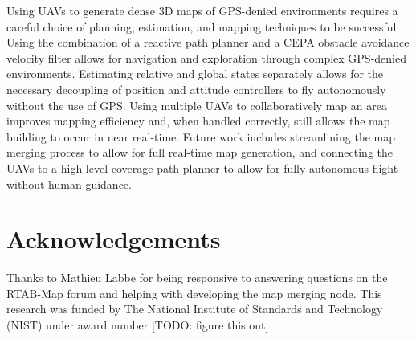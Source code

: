 \documentclass[letterpaper, 10 pt, conference]{ieeeconf}  %
\newcommand{\todo}[1]{{\color{blue}[TODO: #1]}}
\begin{document}
Using UAVs to generate dense 3D maps of GPS-denied environments requires a careful choice of planning, estimation, and mapping techniques to be successful. Using the combination of a reactive path planner and a CEPA obstacle avoidance velocity filter allows for navigation and exploration through complex GPS-denied environments. Estimating relative and global states separately allows for the necessary decoupling of position and attitude controllers to fly autonomously without the use of GPS. Using multiple UAVs to collaboratively map an area improves mapping efficiency and, when handled correctly, still allows the map building to occur in near real-time. Future work includes streamlining the map merging process to allow for full real-time map generation, and connecting the UAVs to a high-level coverage path planner to allow for fully autonomous flight without human guidance.

\section{Acknowledgements}
Thanks to Mathieu Labbe for being responsive to answering questions on the RTAB-Map forum and helping with developing the map merging node. This research was funded by The National Institute of Standards and Technology (NIST) under award number \todo{figure this out}
\end{document}
